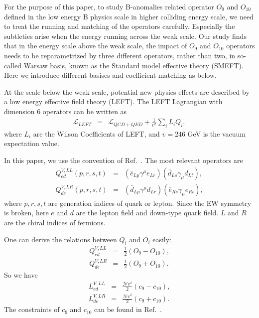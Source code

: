 \documentclass[a4paper,11pt]{article}
\begin{document}
For the purpose of this paper, to study B-anomalies related operator $O_9$ and $O_{10}$ defined in the low energy B physics scale in higher colliding energy scale, we need to treat the running and matching of the operators carefully. 
Especially the subtleties arise when the energy running across the weak scale. Our study finds that in the energy scale above the weak scale, the impact of $O_9$ and $O_{10}$ operators needs to be reparametrized by three different operators, rather than two, in so-called Warsaw basis, known as the Standard model effective theory (SMEFT). Here we introduce different basises and coefficient matching as below. 

 At the scale below the weak scale, potential new physics effects are described by a low energy effective field theory (LEFT).  
The LEFT Lagrangian with dimension 6 operators can be written as 
\begin{eqnarray}
  \mathcal{L}_{LEFT} &=& \mathcal{L}_{QCD+QED}+ \frac{1}{v^2}\sum_{i}L_iQ_i,  \nonumber 
\end{eqnarray} 
where $L_i$ are the Wilson Coefficients of LEFT, and $v=246$ GeV is the vacuum expectation value. 

In this paper, we use the convention of Ref.~\cite{Jenkins:2017jig}. 
The most relevant operators are 
\begin{eqnarray}
  Q^{V,LL}_{ed}(p,r,s,t) &=& (\bar{e}_{Lp}\gamma^\mu e_{Lr})(\bar{d}_{Ls}\gamma_\mu d_{Lt}),  \label{QVLLed} \\
  Q^{V,LR}_{de}(p,r,s,t) &=& (\bar{d}_{Lp}\gamma^\mu d_{Lr})(\bar{e}_{Rs}\gamma_\mu e_{Rt}),  \label{QVLRde}
\end{eqnarray}
where $p,r,s,t$ are generation indices of quark or lepton. 
Since the EW symmetry is broken, here $e$ and $d$ are the lepton field and down-type quark field. 
$L$ and $R$ are the chiral indices of fermions. 



One can derive the relations between $Q_i$ and $O_i$ easily:
\begin{eqnarray}
  Q^{V,LL}_{ed} &=& \frac{1}{2}\left(O_9-O_{10}\right),  \\
  Q^{V,LR}_{de} &=& \frac{1}{2}\left(O_9+O_{10}\right).   
\end{eqnarray}
So we have 
\begin{eqnarray}
  L^{V,LL}_{ed} &=& \frac{\mathcal{N}v^2}{2}(c_9-c_{10}),  \\
  L^{V,LR}_{de} &=& \frac{\mathcal{N}v^2}{2}(c_9+c_{10}). 
\end{eqnarray}
The constraints of $c_9$ and $c_{10}$ can be found in Ref.~\cite{Altmannshofer:2021qrr}.
\end{document}
